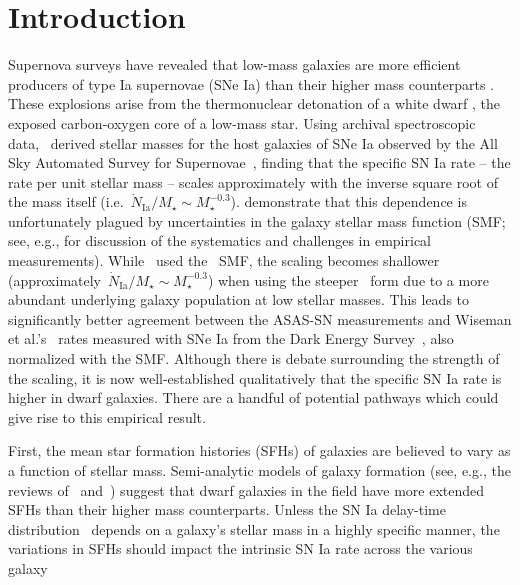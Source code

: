 \documentclass[ms.tex]{subfiles}
\begin{document}
\section{Introduction}
\label{sec:intro}

Supernova surveys have revealed that low-mass galaxies are more efficient
producers of type Ia supernovae (SNe Ia) than their higher mass counterparts
\citep[e.g.][]{Mannucci2005, Sullivan2006, Smith2012}.
These explosions arise from the thermonuclear detonation of a white dwarf
\cite[WD;][]{Hoyle1960}, the exposed carbon-oxygen core of a low-mass star.
Using archival spectroscopic data,~\citet{Brown2019} derived stellar masses for
the host galaxies of SNe Ia observed by the All Sky Automated Survey for
Supernovae~\citep[ASAS-SN;][]{Shappee2014, Kochanek2017}, finding that the
specific SN Ia rate -- the rate per unit stellar mass -- scales approximately
with the inverse square root of the mass itself (i.e.~$\dot{N}_\text{Ia} /
M_\star \sim M_\star^{-0.3}$).
\citet{Gandhi2022} demonstrate that this dependence is unfortunately plagued by
uncertainties in the galaxy stellar mass function (SMF; see, e.g.,
\citealp*{Weigel2016} for discussion of the systematics and challenges in
empirical measurements).
While~\citet{Brown2019} used the~\citet{Bell2003} SMF, the scaling becomes
shallower (approximately~$\dot{N}_\text{Ia} / M_\star \sim M_\star^{-0.3}$)
when using the steeper~\citet{Baldry2012} form due to a more abundant
underlying galaxy population at low stellar masses.
This leads to significantly better agreement between the ASAS-SN measurements
and Wiseman et al.'s~\citeyearpar{Wiseman2021} rates measured with SNe Ia from
the Dark Energy Survey~\citep[DES;][]{DES2016}, also normalized with the
\citet{Baldry2012} SMF.
Although there is debate surrounding the strength of the scaling, it is now
well-established qualitatively that the specific SN Ia rate is higher in dwarf
galaxies.
There are a handful of potential pathways which could give rise to this
empirical result.
\par
First, the mean star formation histories (SFHs) of galaxies are believed to
vary as a function of stellar mass. Semi-analytic models of galaxy formation
(see, e.g., the reviews of~\citealp{Baugh2006} and~\citealp{Somerville2015a})
suggest that dwarf galaxies in the field have more extended SFHs than their
higher mass counterparts.
Unless the SN Ia delay-time distribution~\citep[DTD; e.g.,][]{Maoz2012a}
depends on a galaxy's stellar mass in a highly specific manner, the variations
in SFHs should impact the intrinsic SN Ia rate across the various galaxy
\end{document}
